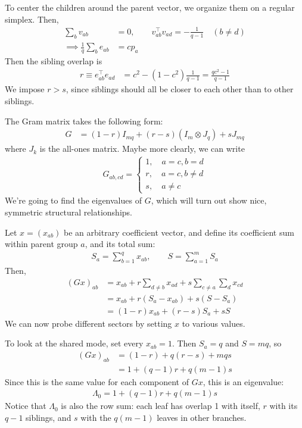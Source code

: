 \documentclass[11pt, reqno]{amsart}
\theoremstyle{notestyle}
\theoremstyle{defstyle}
\begin{document}
To center the children around the parent vector, we organize them on a regular simplex.
Then,
\begin{align*}
    \sum_b v_{ab} &= 0,
    \qquad
    v_{ab}^\top v_{ad} = -\frac{1}{q-1} \quad (b \neq d) \\
    \implies
    \frac{1}{q} \sum_b e_{ab} &= cp_a
\end{align*}
Then the sibling overlap is
\begin{align*}
    r \equiv
    e_{ab}^\top e_{ad}
    &= c^2 - (1-c^2) \frac{1}{q-1}
    = \frac{qc^2-1}{q-1}
\end{align*}
We impose $r > s$, since siblings should all be closer to each other than to other siblings.

The Gram matrix takes the following form:
\begin{align*}
    G
    &= (1-r)I_{mq} + (r-s)(I_m \otimes J_q) + sJ_{mq}
\end{align*}
where $J_k$ is the all-ones matrix.
Maybe more clearly, we can write
\begin{align*}
    G_{ab,cd}
    = \begin{cases}
    1, \quad a=c, b=d\\
    r, \quad a=c, b\neq d\\
    s, \quad a\neq c
    \end{cases}
\end{align*}
We're going to find the eigenvalues of $G$, which will turn out show nice, symmetric structural relationships.

Let $x = (x_{ab})$ be an arbitrary coefficient vector, and define its coefficient sum within parent group $a$, and its total sum:
\begin{align*}
    S_a
    = \sum_{b=1}^q x_{ab},
    \qquad S = \sum_{a=1}^m S_a
\end{align*}
Then,
\begin{align*}
    (Gx)_{ab}
    &= x_{ab} + r \sum_{d\neq b} x_{ad} + s \sum_{c\neq a} \sum_{d} x_{cd} \\
    &= x_{ab} + r(S_a - x_{ab}) + s(S - S_a) \\
    &= (1-r)x_{ab} + (r-s) S_a + sS
\end{align*}
We can now probe different sectors by setting $x$ to various values.

To look at the shared mode, set every $x_{ab}=1$.
Then $S_a = q$ and $S=mq$, so
\begin{align*}
    (Gx)_{ab} &= (1-r) + q(r-s) + mqs\\
    &= 1 + (q-1)r + q(m-1)s
\end{align*}
Since this is the same value for each component of $Gx$, this is an eigenvalue:
\begin{align*}
    \boxed{\Lambda_0 = 1 + (q-1)r + q(m-1)s}
\end{align*}
Notice that $\Lambda_0$ is also the row sum: each leaf has overlap 1 with itself, $r$ with its $q-1$ siblings, and $s$ with the $q(m-1)$ leaves in other branches.
\end{document}
